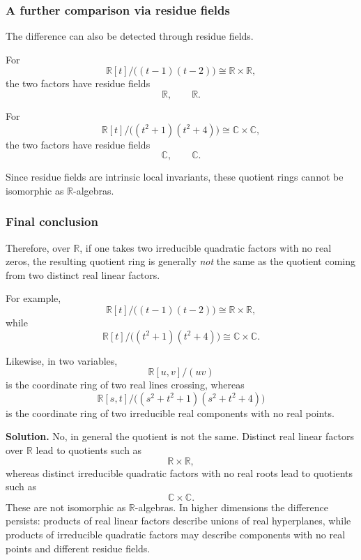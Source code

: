 \documentclass[12pt,a4paper]{article}
\theoremstyle{notespace}
\theoremstyle{definition}
\begin{document}
\subsubsection{A further comparison via residue fields}

The difference can also be detected through residue fields.

For
\[
\mathbb{R}[t]/\bigl((t-1)(t-2)\bigr)\cong \mathbb{R}\times \mathbb{R},
\]
the two factors have residue fields
\[
\mathbb{R},\qquad \mathbb{R}.
\]

For
\[
\mathbb{R}[t]/\bigl((t^2+1)(t^2+4)\bigr)\cong \mathbb{C}\times \mathbb{C},
\]
the two factors have residue fields
\[
\mathbb{C},\qquad \mathbb{C}.
\]

Since residue fields are intrinsic local invariants, these quotient rings cannot be isomorphic as \(\mathbb{R}\)-algebras.

\subsubsection{Final conclusion}

Therefore, over \(\mathbb{R}\), if one takes two irreducible quadratic factors with no real zeros, the resulting quotient ring is generally \emph{not} the same as the quotient coming from two distinct real linear factors.

For example,
\[
\mathbb{R}[t]/\bigl((t-1)(t-2)\bigr)\cong \mathbb{R}\times \mathbb{R},
\]
while
\[
\mathbb{R}[t]/\bigl((t^2+1)(t^2+4)\bigr)\cong \mathbb{C}\times \mathbb{C}.
\]

Likewise, in two variables,
\[
\mathbb{R}[u,v]/(uv)
\]
is the coordinate ring of two real lines crossing, whereas
\[
\mathbb{R}[s,t]\Big/\bigl((s^2+t^2+1)(s^2+t^2+4)\bigr)
\]
is the coordinate ring of two irreducible real components with no real points.

\medskip

\textbf{Solution.}
No, in general the quotient is not the same. Distinct real linear factors over \(\mathbb{R}\) lead to quotients such as
\[
\mathbb{R}\times \mathbb{R},
\]
whereas distinct irreducible quadratic factors with no real roots lead to quotients such as
\[
\mathbb{C}\times \mathbb{C}.
\]
These are not isomorphic as \(\mathbb{R}\)-algebras. In higher dimensions the difference persists: products of real linear factors describe unions of real hyperplanes, while products of irreducible quadratic factors may describe components with no real points and different residue fields.
\end{document}
